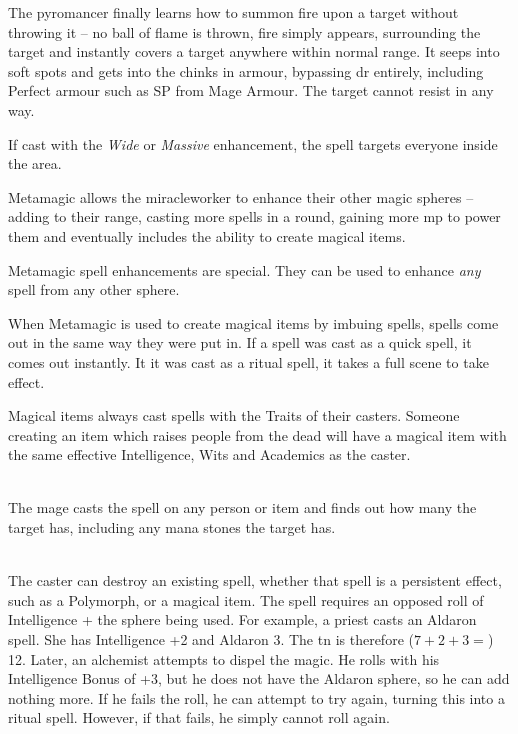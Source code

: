 \begin{multicols}{2}
The pyromancer finally learns how to summon fire upon a target without throwing it -- no ball of flame is thrown, fire simply appears, surrounding the target and instantly covers a target anywhere within normal range. It seeps into soft spots and gets into the chinks in armour, bypassing \gls{dr} entirely, including Perfect armour such as \gls{SP} from Mage Armour. The target cannot resist in any way.

If cast with the \textit{Wide} or \textit{Massive} enhancement, the spell targets everyone inside the area.

\end{multicols}


\begin{multicols}{2}


\noindent
Metamagic allows the \gls{miracleworker} to enhance their other magic spheres -- adding to their range, casting more spells in a \gls{round}, gaining more \gls{mp} to power them and eventually includes the ability to create magical items.

Metamagic spell enhancements are special.
They can be used to enhance \emph{any} spell from any other sphere.

When Metamagic is used to create magical items by imbuing spells, spells come out in the same way they were put in.
If a spell was cast as a quick spell, it comes out instantly.
It it was cast as a ritual spell, it takes a full scene to take effect.

Magical items always cast spells with the Traits of their casters.
Someone creating an item which raises people from the dead will have a magical item with the same effective Intelligence, Wits and Academics as the caster.

\spelllevel

\\
The mage casts the spell on any person or item and finds out how many  the target has, including any mana stones the target has.

\\
The caster can destroy an existing spell, whether that spell is a persistent effect, such as a Polymorph, or a magical item.
The spell requires an opposed roll of Intelligence + the sphere being used.
For example, a priest casts an Aldaron spell.
She has Intelligence +2 and Aldaron 3.
The \gls{tn} is therefore ($7+2+3=$) 12.
Later, an alchemist attempts to dispel the magic.
He rolls with his Intelligence Bonus of +3, but he does not have the Aldaron sphere, so he can add nothing more.
If he fails the roll, he can attempt to try again, turning this into a ritual spell.
However, if that fails, he simply cannot roll again.


\end{multicols}
